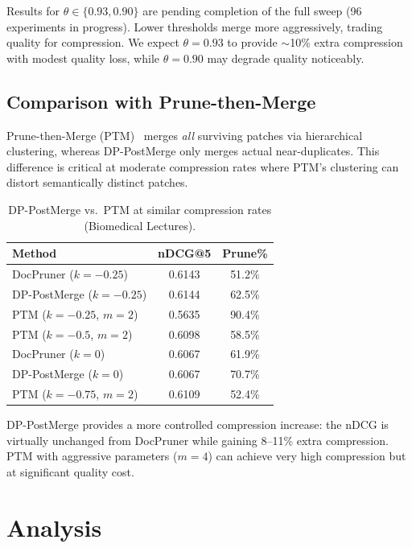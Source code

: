\documentclass[11pt]{article}
\begin{document}
Results for $\theta \in \{0.93, 0.90\}$ are pending completion of the full sweep (96 experiments in progress).
Lower thresholds merge more aggressively, trading quality for compression.
We expect $\theta = 0.93$ to provide $\sim$10\% extra compression with modest quality loss, while $\theta = 0.90$ may degrade quality noticeably.

\subsection{Comparison with Prune-then-Merge}

Prune-then-Merge (PTM)~\cite{yan2026ptm} merges \emph{all} surviving patches via hierarchical clustering, whereas DP-PostMerge only merges actual near-duplicates.
This difference is critical at moderate compression rates where PTM's clustering can distort semantically distinct patches.

\begin{table}[t]
\centering
\small
\caption{DP-PostMerge vs.\ PTM at similar compression rates (Biomedical Lectures).}
\label{tab:vs_ptm}
\begin{tabular}{l c c}
\toprule
\textbf{Method} & \textbf{nDCG@5} & \textbf{Prune\%} \\
\midrule
DocPruner ($k{=}{-}0.25$) & 0.6143 & 51.2\% \\
DP-PostMerge ($k{=}{-}0.25$) & 0.6144 & 62.5\% \\
PTM ($k{=}{-}0.25$, $m{=}2$) & 0.5635 & 90.4\% \\
PTM ($k{=}{-}0.5$, $m{=}2$) & 0.6098 & 58.5\% \\
\midrule
DocPruner ($k{=}0$) & 0.6067 & 61.9\% \\
DP-PostMerge ($k{=}0$) & 0.6067 & 70.7\% \\
PTM ($k{=}{-}0.75$, $m{=}2$) & 0.6109 & 52.4\% \\
\bottomrule
\end{tabular}
\end{table}

DP-PostMerge provides a more controlled compression increase: the nDCG is virtually unchanged from DocPruner while gaining 8--11\% extra compression.
PTM with aggressive parameters ($m=4$) can achieve very high compression but at significant quality cost.


\section{Analysis}
\end{document}
